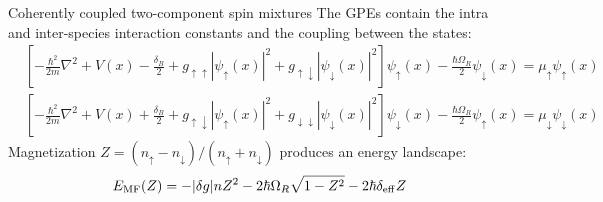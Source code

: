 \documentclass[aspectratio=169]{beamer}
\begin{document}

\begin{frame}{Coherently coupled two-component spin mixtures}
  The GPEs contain the intra and inter-species interaction constants and the coupling between the states:
  \begin{equation*}
    \begin{aligned}
        &\left[ -\frac{\hbar^2}{2m}\nabla^2 + V(x) - \frac{\delta_B}{2} + g_{\uparrow\uparrow}|\psi_\uparrow(x)|^2 + g_{\uparrow\downarrow}|\psi_\downarrow(x)|^2
        \right] \psi_\uparrow(x) - \frac{\hbar\Omega_R}{2}\psi_\downarrow(x) = \mu_\uparrow \psi_\uparrow(x) \\
        &\left[ -\frac{\hbar^2}{2m}\nabla^2 + V(x) + \frac{\delta_B}{2} + g_{\uparrow\downarrow}|\psi_\uparrow(x)|^2 + g_{\downarrow\downarrow}|\psi_\downarrow(x)|^2
        \right] \psi_\downarrow(x) - \frac{\hbar\Omega_R}{2}\psi_\uparrow(x) = \mu_\downarrow \psi_\downarrow(x)
    \end{aligned}
  \end{equation*}
  Magnetization $Z = (n_\uparrow-n_\downarrow)/(n_\uparrow+n_\downarrow)$ produces an energy landscape:
  \begin{equation*}
      E_{\rm MF}(Z) = -|\delta g|n Z^2 - 2\hbar\Omega_R \sqrt{1-Z^2} - 2\hbar\delta_{\rm eff} Z
      \label{eq:E_MF}
  \end{equation*}
\end{frame}
\end{document}
